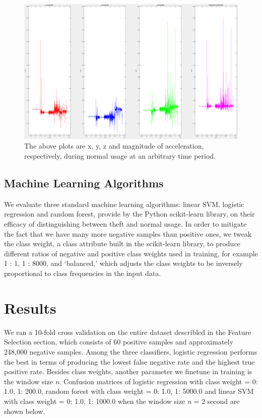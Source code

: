 \documentclass{soups}
\begin{document}
\begin{figure}[H]
\includegraphics[width=1.0\columnwidth]{neg_acc_separated.png}
\caption{The above plots are x, y, z and magnitude of acceleration, respectively, during normal usage at an arbitrary time period.}
\end{figure}



\subsection{Machine Learning Algorithms}
We evaluate three standard machine learning algorithms: linear SVM, logistic regression and random forest, provide by the Python scikit-learn library, on their efficacy of distinguishing between theft and normal usage. 
In order to mitigate the fact that we have many more negative samples than positive ones, we tweak the class weight, a class attribute built in the scikit-learn library, to produce different ratios of negative and positive class weights used in training, for example 1 : 1, 1 : 8000, and `balanced,' which adjusts the class weights to be inversely proportional to class frequencies in the input data.



\section{Results}
We ran a 10-fold cross validation on the entire dataset describled in the Feature Selection section, which consists of 60 positive samples and approximately 248,000 negative samples. 
Among the three classifiers, logistic regression performs the best in terms of producing the lowest false negative rate and the highest true positive rate. 
Besides class weights, another parameter we finetune in training is the window size \textit{n}. 
Confusion matrices of logistic regression with class weight = {0: 1.0, 1: 200.0}, random forest with class weight = {0: 1.0, 1: 5000.0} and linear SVM with class weight = {0: 1.0, 1: 1000.0} when the window size \textit{n} = 2 second are shown below.
\end{document}
